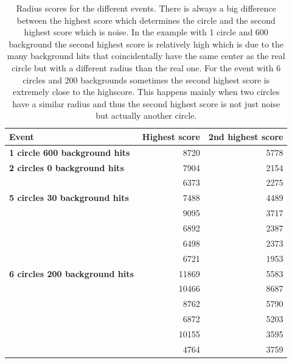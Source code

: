 \documentclass[11pt,twoside]{scrreprt}
\begin{document}
\begin{table}[tbp]
  \caption{Radius scores for the different events. There is always a big difference between the highest score
  which determines the circle and the second highest score which is noise. In the example with 1 circle and 600
  background the second highest score is relatively high which is due to the many background hits that coincidentally
  have the same center as the real circle but with a different radius than the real one. For the event with 6 circles 
  and 200 backgrounds sometimes the second highest score is extremely close to the highscore.
  This happens mainly when two circles have a similar radius and thus the second highest score is not just noise but actually
  another circle.}
  \label{tab:2d_scores}
  \centering

  \begin{tabular}{lrr}
  \toprule
  \textbf{Event} & \textbf{Highest score} & \textbf{2nd highest score} \\
  \midrule
  \midrule
  \textbf{1 circle 600 background hits} & 8720 & 5778\\
  \midrule
  \textbf{2 circles 0 background hits} & 7904 & 2154\\
   & 6373 & 2275\\
  \midrule
  \textbf{5 circles 30 background hits} & 7488 & 4489\\
  & 9095 & 3717\\
  & 6892 & 2387\\
  & 6498 & 2373\\
  & 6721 & 1953\\
  \midrule
  \textbf{6 circles 200 background hits} & 11869 & 5583\\
  & 10466 & 8687\\
  & 8762 & 5790\\
  & 6872 & 5203\\
  & 10155  & 3595\\
  & 4764 &  3759\\
  \bottomrule
  \end{tabular}
\end{table}
\end{document}
